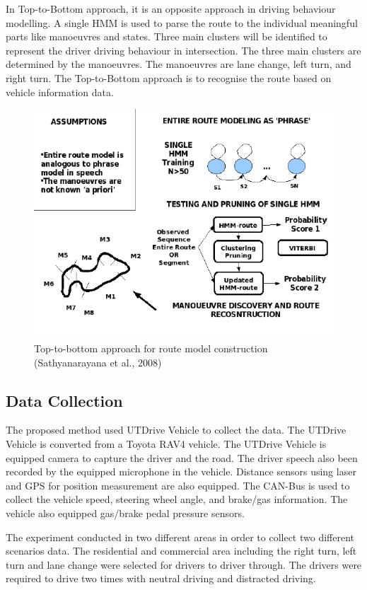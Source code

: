 In Top-to-Bottom approach, it is an opposite approach in driving behaviour modelling. A single HMM is used to parse the route to the individual meaningful parts like manoeuvres and states. Three main clusters will be identified to represent the driver driving behaviour in intersection. The three main clusters are determined by the manoeuvres. The manoeuvres are lane change, left turn, and right turn. The Top-to-Bottom approach is to recognise the route based on vehicle information data.

\begin{figure}[hbt!]\centering
\includegraphics[width=.75\textwidth]{image/ToptoBottom}
\caption{Top-to-bottom approach for route model construction (Sathyanarayana et al., 2008)}
\end{figure}

\subsection{Data Collection}
The proposed method used UTDrive Vehicle to collect the data. The UTDrive Vehicle is converted from a Toyota RAV4 vehicle. The UTDrive Vehicle is equipped camera to capture the driver and the road. The driver speech also been recorded by the equipped microphone in the vehicle. Distance sensors using laser and GPS for position measurement are also equipped. The CAN-Bus is used to collect the vehicle speed, steering wheel angle, and brake/gas information. The vehicle also equipped gas/brake pedal pressure sensors. 

The experiment conducted in two different areas in order to collect two different scenarios data. The residential and commercial area including the right turn, left turn and lane change were selected for drivers to driver through. The drivers were required to drive two times with neutral driving and distracted driving. 
 
